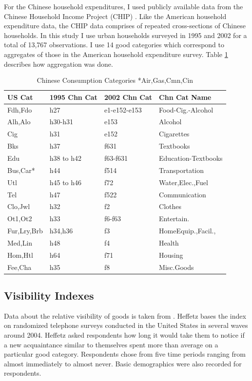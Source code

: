 For the Chinese household expenditures, I used publicly available data from the Chinese Household Income Project (CHIP) \citep{CHIP2002}. Like the American household expenditure data, the CHIP data comprises of repeated cross-sections of Chinese households.  In this study I use urban households surveyed in 1995 and 2002 for a total of 13,767 observations.  I use 14 good categories which correspond to aggregates of those in the American household expenditure survey.   Table \ref{tab:chncons} describes how aggregation was done.
\begin{table}
    \centering
    \footnotesize
 \begin{tabular}{llll}
        \hline
        US Cat & 1995 Chn Cat & 2002 Chn Cat & Chn Cat Name  \\
        \hline \hline
        Fdh,Fdo     & h27        & e1-e152-e153 & Food-Cig.-Alcohol\\
        Alh,Alo     & h30-h31    & e153         & Alcohol\\
        Cig         & h31        & e152         & Cigarettes\\
        Bks         & h37        & f631         & Textbooks\\
        Edu         & h38 to h42 & f63-f631     & Education-Textbooks\\
        Bus,Car*    & h44        & f514         & Transportation\\
        Utl         & h45 to h46 & f72          & Water,Elec.,Fuel\\
        Tel         & h47        & f522         & Communication\\
        Clo,Jwl     & h32        & f2           & Clothes\\
        Ot1,Ot2     & h33        & f6-f63       & Entertain.\\
        Fur,Lry,Brb & h34,h36    & f3           & HomeEquip.,Facil.,\\
        Med,Lin     & h48        & f4           & Health\\
        Hom,Htl     & h64        & f71          & Housing\\
        Fee,Cha     & h35        & f8           & Misc.Goods\\\hline
 \end{tabular}
    \caption{Chinese Consumption Categories \scriptsize{*Air,Gas,Cmn,Cin}}
    \label{tab:chncons}
\end{table}

\subsection{Visibility Indexes}
Data about the relative visibility of goods is taken from \citet{Heffetz2011}.  
Heffetz bases the index on randomized telephone surveys conducted in the United States in several waves around 2004.
Heffetz asked respondents how long it would take them to notice if a new acquaintance similar to themselves spent more than average on a particular good category.
Respondents chose from five time periods ranging from almost immediately to almost never.
Basic demographics were also recorded for respondents.

